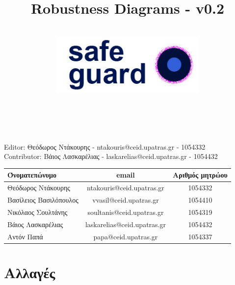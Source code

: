 \documentclass{article}
\title{Robustness Diagrams - v0.2}
\author{\\
\includegraphics[width=3in]{safeguard}\\[1ex]\\\\
}
\begin{document}
\maketitle

\newpage

\noident Editor: Θεόδωρος Ντάκουρης - ntakouris@ceid.upatras.gr - 1054332\\
Contributor: Βάιος Λασκαρέλιας - laskarelias@ceid.upatras.gr - 1054432\\

\begin{tabular}{|l|c|c|}
\hline
Όνοματεπώνυμο & email & Αριθμός μητρώου  \\
\hline
Θεόδωρος Ντάκουρης & ntakouris@ceid.upatras.gr & 1054332 \\
Βασίλειος Βασιλόπουλος & vvasil@ceid.upatras.gr &  1054410 \\
Νικόλαος Σουλτάνης & soultanis@ceid.upatras.gr & 1054319  \\
Βάιος Λασκαρέλιας & laskarelias@ceid.upatras.gr & 1054432 \\
Αντόν Παπά & papa@ceid.upatras.gr & 1054337 \\
\hline
\end{tabular}

\renewcommand{\contentsname}{Περιεχόμενα}
\tableofcontents

\section{Αλλαγές}
\end{document}
